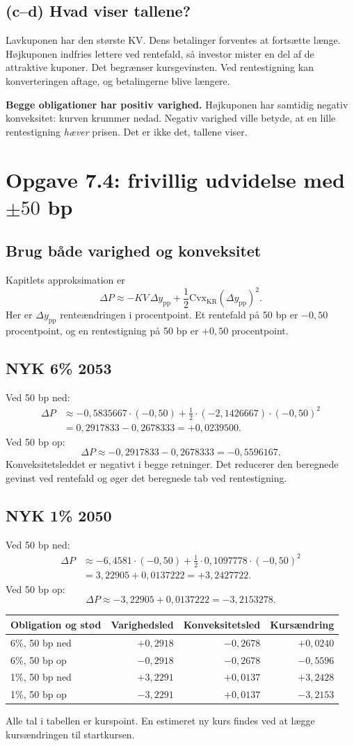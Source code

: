 \documentclass[11pt,a4paper]{article}
\newcommand{\opgave}[1]{\section*{#1}}
\newcommand{\del}[1]{\subsection*{#1}}
\newcommand{\pp}{\text{pp}}
\begin{document}
\del{(c--d) Hvad viser tallene?}
Lavkuponen har den største KV. Dens betalinger forventes at fortsætte længe. Højkuponen indfries lettere ved rentefald, så investor mister en del af de attraktive kuponer. Det begrænser kursgevinsten. Ved rentestigning kan konverteringen aftage, og betalingerne blive længere.

\textbf{Begge obligationer har positiv varighed.} Højkuponen har samtidig negativ konveksitet: kurven krummer nedad. Negativ varighed ville betyde, at en lille rentestigning \emph{hæver} prisen. Det er ikke det, tallene viser.

\newpage
\opgave{Opgave 7.4: frivillig udvidelse med $\pm50$ bp}
\del{Brug både varighed og konveksitet}
Kapitlets approksimation er
\[
\boxed{\Delta P\approx-KV\,\Delta y_{\pp}+\frac12\mathrm{Cvx}_{\mathrm{KR}}(\Delta y_{\pp})^2}.
\]
Her er $\Delta y_{\pp}$ renteændringen i procentpoint. Et rentefald på 50 bp er $-0{,}50$ procentpoint, og en rentestigning på 50 bp er $+0{,}50$ procentpoint.

\del{NYK 6\% 2053}
Ved 50 bp ned:
\[
\begin{aligned}
\Delta P&\approx-0{,}5835667\cdot(-0{,}50)
+\tfrac12\cdot(-2{,}1426667)\cdot(-0{,}50)^2\\
&=0{,}2917833-0{,}2678333=\boxed{+0{,}0239500}.
\end{aligned}
\]
Ved 50 bp op:
\[
\Delta P\approx-0{,}2917833-0{,}2678333=\boxed{-0{,}5596167}.
\]
Konveksitetsleddet er negativt i begge retninger. Det reducerer den beregnede gevinst ved rentefald og øger det beregnede tab ved rentestigning.

\del{NYK 1\% 2050}
Ved 50 bp ned:
\[
\begin{aligned}
\Delta P&\approx-6{,}4581\cdot(-0{,}50)
+\tfrac12\cdot0{,}1097778\cdot(-0{,}50)^2\\
&=3{,}22905+0{,}0137222=\boxed{+3{,}2427722}.
\end{aligned}
\]
Ved 50 bp op:
\[
\Delta P\approx-3{,}22905+0{,}0137222=\boxed{-3{,}2153278}.
\]

\begin{center}\begin{tabular}{lrrr}\toprule
Obligation og stød & Varighedsled & Konveksitetsled & Kursændring\\\midrule
6\%, 50 bp ned & $+0{,}2918$ & $-0{,}2678$ & $+0{,}0240$\\
6\%, 50 bp op & $-0{,}2918$ & $-0{,}2678$ & $-0{,}5596$\\
1\%, 50 bp ned & $+3{,}2291$ & $+0{,}0137$ & $+3{,}2428$\\
1\%, 50 bp op & $-3{,}2291$ & $+0{,}0137$ & $-3{,}2153$\\\bottomrule
\end{tabular}\end{center}
Alle tal i tabellen er kurspoint. En estimeret ny kurs findes ved at lægge kursændringen til startkursen.
\end{document}
